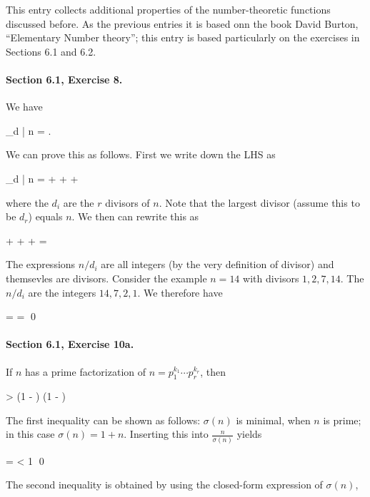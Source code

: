 
This entry collects additional properties of the number-theoretic functions discussed before. As the previous entries it is based onn the book David Burton, ``Elementary Number theory''; this entry is based particularly on the exercises in Sections 6.1 and 6.2.

\paragraph{Section 6.1, Exercise 8.} We have

\bee
\sum_{d | n}  = .
\eee

We can prove this as follows. First we write down the LHS as

\bee
\sum_{d | n}  =  +  + \cdots + 
\eee

where the $d_i$ are the $r$ divisors of $n$. Note that the largest divisor (assume this to be $d_r$) equals $n$. We then can rewrite this as

\bee
{} +  + \cdots +  = 
\eee

The expressions $n/d_i$ are all integers (by the very definition of divisor) and themsevles are divisors. Consider the example $n = 14$ with divisors $1, 2, 7, 14$. The $n / d_i$ are the integers $14, 7, 2, 1$. We therefore have

\bee
{} =  =  \qed
\eee

\paragraph{Section 6.1, Exercise 10a.} If $n$ has a prime factorization of $n = p_1^{k_1} \cdots p_r^{k_r}$, then

 \geq {} > \left(1 - \right) \cdots \left(1 - \right)
\eee

The first inequality can be shown as follows: $\sigma(n)$ is minimal, when $n$ is prime; in this case $\sigma(n) = 1 + n$. Inserting this into $\frac{n}{\sigma(n)}$ yields

\bee
{} =  < 1 \qed
\eee

The second inequality is obtained by using the closed-form expression of $\sigma(n)$,


